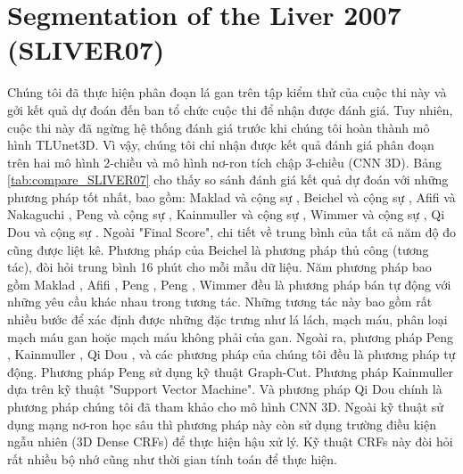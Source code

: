 \section{Segmentation of the Liver 2007 (SLIVER07)}
Chúng tôi đã thực hiện phân đoạn lá gan trên tập kiểm thử của cuộc thi này và gởi kết quả dự đoán đến ban tổ chức cuộc thi để nhận được đánh giá. Tuy nhiên, cuộc thi này đã ngừng hệ thống đánh giá trước khi chúng tôi hoàn thành mô hình TLUnet3D. Vì vậy, chúng tôi chỉ nhận được kết quả đánh giá phân đoạn trên hai mô hình 2-chiều và mô hình nơ-ron tích chập 3-chiều (CNN 3D). Bảng \ref{tab:compare_SLIVER07} cho thấy so sánh đánh giá kết quả dự đoán với những phương pháp tốt nhất, bao gồm: Maklad và cộng sự \cite{Maklad_paper}, Beichel và cộng sự \cite{Beichel_paper}, Afifi và Nakaguchi \cite{Afifi_paper}, Peng và cộng sự \cite{Peng_paper} \cite{Peng_Wang_paper} \cite{Peng_Dong_paper}, Kainmuller và cộng sự \cite{Kainmuller_paper}, Wimmer và cộng sự \cite{Wimmer_paper}, Qi Dou và cộng sự \cite{dsn_paper}. Ngoài "Final Score", chi tiết về trung bình của tất cả năm độ đo cũng được liệt kê. Phương pháp của Beichel \cite{Beichel_paper} là phương pháp thủ công (tương tác), đòi hỏi trung bình 16 phút cho mỗi mẫu dữ liệu. Năm phương pháp bao gồm Maklad \cite{Maklad_paper}, Afifi \cite{Afifi_paper}, Peng \cite{Peng_Wang_paper}, Peng \cite{Peng_Dong_paper}, Wimmer \cite{Wimmer_paper} đều là phương pháp bán tự động với những yêu cầu khác nhau trong tương tác. Những tương tác này bao gồm rất nhiều bước để xác định được những đặc trưng như lá lách, mạch máu, phân loại mạch máu gan hoặc mạch máu không phải của gan. Ngoài ra, phương pháp  Peng \cite{Peng_paper}, Kainmuller \cite{Kainmuller_paper}, Qi Dou \cite{dsn_paper}, và các phương pháp của chúng tôi đều là phương pháp tự động. Phương pháp Peng \cite{Peng_paper} sử dụng kỹ thuật Graph-Cut. Phương pháp Kainmuller \cite{Kainmuller_paper} dựa trên kỹ thuật "Support Vector Machine". Và phương pháp Qi Dou \cite{dsn_paper} chính là phương pháp chúng tôi đã tham khảo cho mô hình CNN 3D. Ngoài kỹ thuật sử dụng mạng nơ-ron học sâu thì phương pháp này còn sử dụng trường điều kiện ngẫu nhiên (3D Dense CRFs) để thực hiện hậu xử lý. Kỹ thuật CRFs này đòi hỏi rất nhiều bộ nhớ cũng như thời gian tính toán để thực hiện.
